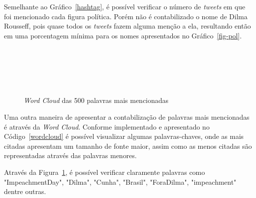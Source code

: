 Semelhante ao Gráfico~\ref{hashtag}, é possível verificar o número de \textit{tweets} em que foi mencionado cada figura política. Porém não é contabilizado o nome de Dilma Rousseff, pois quase todos os \textit{tweets} fazem alguma menção a ela, resultando então em uma porcentagem mínima para os nomes apresentados no Gráfico~\ref{fig-pol}. \\ \\ \\ \\ \\ \\

\begin{figure}[h]
	\centering
    \vspace{-0.2cm}
	\caption{\textit{Word Cloud} das 500 palavras mais mencionadas}
	\label{fig:wordcloud}
\end{figure}

Uma outra maneira de apresentar a contabilização de palavras mais mencionadas é através da \textit{Word Cloud}. Conforme implementado e apresentado no Código~\ref{wordcloud} é possível visualizar algumas palavras-chaves, onde as mais citadas apresentam um tamanho de fonte maior, assim como as menos citadas são representadas através das palavras menores.

Através da Figura~\ref{fig:wordcloud}, é possível verificar claramente palavras como "ImpeachmentDay", "Dilma", "Cunha", "Brasil", "ForaDilma", "impeachment" dentre outras.

